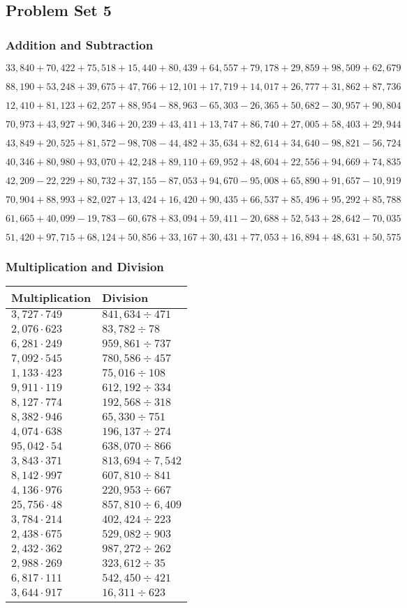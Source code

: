 \hypertarget{problem-set-5-4}{%
\subsection{Problem Set 5}\label{problem-set-5-4}}

\hypertarget{addition-and-subtraction-227}{%
\subsubsection{Addition and
Subtraction}\label{addition-and-subtraction-227}}

\(33,840+70,422+75,518+15,440+80,439+64,557+79,178+29,859+98,509+ 62,679\)

\(88,190+53,248+39,675+47,766+12,101+17,719+14,017+26,777+31,862+87,736\)

\(12,410+81,123+62,257+88,954-88,963-65,303-26,365+50,682-30,957+90,804\)

\(70,973+43,927+90,346+20,239+43,411+13,747+86,740+27,005+58,403+29,944\)

\(43,849+20,525+81,572-98,708-44,482+35,634+82,614+34,640-98,821-56,724\)

\(40,346+80,980+93,070+42,248+89,110+69,952+48,604+22,556+94,669+74,835\)

\(42,209-22,229+80,732+37,155-87,053+94,670-95,008+65,890+91,657-10,919\)

\(70,904+88,993+82,027+13,424+16,420+90,435+66,537+85,496+95,292+85,788\)

\(61,665+40,099-19,783-60,678+83,094+59,411-20,688+52,543+28,642-70,035\)

\(51,420+97,715+68,124+50,856+33,167+30,431+77,053+16,894+48,631+50,575\)

\hypertarget{multiplication-and-division-226}{%
\subsubsection{Multiplication and
Division}\label{multiplication-and-division-226}}

\begin{longtable}[]{@{}ll@{}}
\toprule
Multiplication & Division\tabularnewline
\midrule
\endhead
\(3,727\cdot749\) & \(841,634÷471\)\tabularnewline
\(2,076\cdot623\) & \(83,782÷78\)\tabularnewline
\(6,281\cdot249\) & \(959,861÷737\)\tabularnewline
\(7,092\cdot545\) & \(780,586÷457\)\tabularnewline
\(1,133\cdot423\) & \(75,016÷108\)\tabularnewline
\(9,911\cdot119\) & \(612,192÷334\)\tabularnewline
\(8,127\cdot774\) & \(192,568÷318\)\tabularnewline
\(8,382\cdot946\) & \(65,330÷751\)\tabularnewline
\(4,074\cdot638\) & \(196,137÷274\)\tabularnewline
\(95,042\cdot54\) & \(638,070÷866\)\tabularnewline
\(3,843\cdot371\) & \(813,694÷7,542\)\tabularnewline
\(8,142\cdot997\) & \(607,810÷841\)\tabularnewline
\(4,136\cdot976\) & \(220,953÷667\)\tabularnewline
\(25,756\cdot48\) & \(857,810÷6,409\)\tabularnewline
\(3,784\cdot214\) & \(402,424÷223\)\tabularnewline
\(2,438\cdot675\) & \(529,082÷903\)\tabularnewline
\(2,432\cdot362\) & \(987,272÷262\)\tabularnewline
\(2,988\cdot269\) & \(323,612÷35\)\tabularnewline
\(6,817\cdot111\) & \(542,450÷421\)\tabularnewline
\(3,644\cdot917\) & \(16,311÷623\)\tabularnewline
\bottomrule
\end{longtable}

